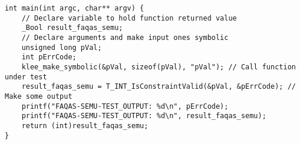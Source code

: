 
\begin{lstlisting}[style=CStyle, caption=SEMuS test template., label=test_template]
int main(int argc, char** argv) {
    // Declare variable to hold function returned value
    _Bool result_faqas_semu; 
    // Declare arguments and make input ones symbolic
    unsigned long pVal;
    int pErrCode;
    klee_make_symbolic(&pVal, sizeof(pVal), "pVal"); // Call function under test
    result_faqas_semu = T_INT_IsConstraintValid(&pVal, &pErrCode); // Make some output
    printf("FAQAS-SEMU-TEST_OUTPUT: %d\n", pErrCode);
    printf("FAQAS-SEMU-TEST_OUTPUT: %d\n", result_faqas_semu);
    return (int)result_faqas_semu;
}

\end{lstlisting}